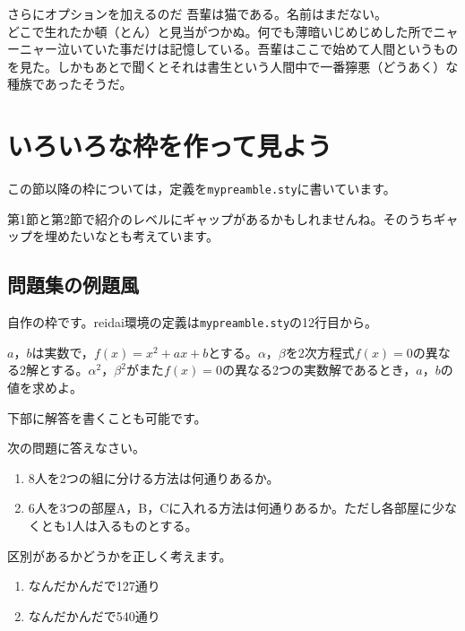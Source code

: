 \documentclass[dvipdfmx]{jsarticle}
\begin{document}
\begin{boxmine}[fontupper=\gtfamily\Large,
before upper=【大きくしてみた。】]{さらにオプションを加えるのだ}
吾輩は猫である。名前はまだない。\\
どこで生れたか頓（とん）と見当がつかぬ。何でも薄暗いじめじめした所でニャーニャー泣いていた事だけは記憶している。吾輩はここで始めて人間というものを見た。しかもあとで聞くとそれは書生という人間中で一番獰悪（どうあく）な種族であったそうだ。
\end{boxmine}


\section{いろいろな枠を作って見よう}

この節以降の枠については，定義を\verb|mypreamble.sty|に書いています。

第1節と第2節で紹介のレベルにギャップがあるかもしれませんね。そのうちギャップを埋めたいなとも考えています。

\subsection{問題集の例題風}

自作の枠です。reidai環境の定義は\verb|mypreamble.sty|の12行目から。

\begin{reidai}
$a$，$b$は実数で，$f(x)=x^2+ax+b$とする。$\alpha$，$\beta$を2次方程式$f(x)=0$の異なる2解とする。$\alpha^2$，$\beta^2$がまた$f(x)=0$の異なる2つの実数解であるとき，$a$，$b$の値を求めよ。
\end{reidai}

下部に解答を書くことも可能です。

\begin{reidai}
次の問題に答えなさい。
\begin{enumerate}
    \item 8人を2つの組に分ける方法は何通りあるか。
    \item 6人を3つの部屋A，B，Cに入れる方法は何通りあるか。ただし各部屋に少なくとも1人は入るものとする。
\end{enumerate}

\tcblower

区別があるかどうかを正しく考えます。
\begin{enumerate}
    \item なんだかんだで127通り
    \item なんだかんだで540通り
\end{enumerate}

\end{reidai}
\end{document}
